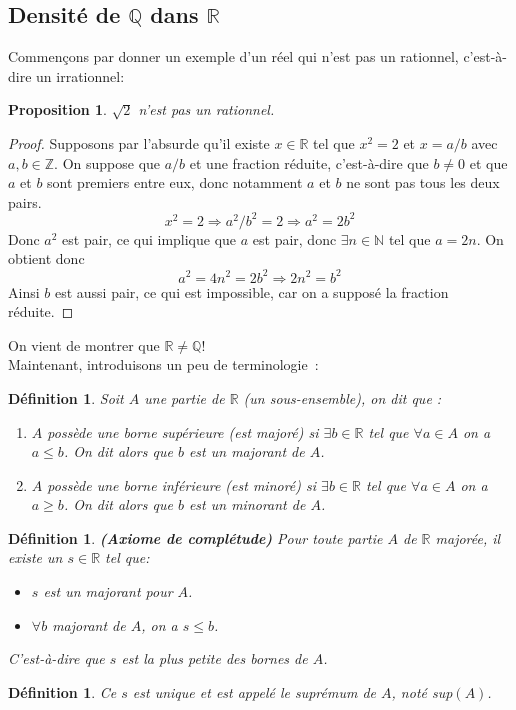 \documentclass[a4paper, 12pt, french, twoside]{article}
\newtheorem{proposition}[theorem]{Proposition}
\newtheorem{defi}[theorem]{Définition}
\newcommand{\Nn}{{\mathbb{N}}}
\newcommand{\Zz}{{\mathbb{Z}}}
\newcommand{\Rr}{{\mathbb{R}}}
\newcommand{\Qq}{{\mathbb{Q}}}
\begin{document}
\subsection{Densité de $\Qq$ dans $\Rr$}
Commençons par donner un exemple d'un réel qui n'est pas un rationnel, c'est-à-dire un irrationnel: 
\begin{proposition}
    $\sqrt{2}$ n'est pas un rationnel. 
\end{proposition}
\begin{proof}
   Supposons par l'absurde qu'il existe $x\in \Rr$ tel que $x^2=2$ et $x=a/b$ avec $a,b \in \Zz$. On suppose que $a/b$ et une fraction réduite, c'est-à-dire que $b\neq 0$ et que $a$ et $b$ sont premiers entre eux, donc notamment $a$ et $b$ ne sont pas tous les deux pairs. 
   $$x^2=2 \Rightarrow a^2/b^2=2 \Rightarrow a^2=2b^2$$
   Donc $a^2$ est pair, ce qui implique que $a$ est pair, donc $\exists n \in \Nn$ tel que $a=2n$. On obtient donc $$a^2=4n^2=2b^2 \Rightarrow 2n^2=b^2$$
   Ainsi $b$ est aussi pair, ce qui est impossible, car on a supposé la fraction réduite. 
\end{proof}
On vient de montrer que $\Rr \neq \Qq$!\\
Maintenant, introduisons un peu de terminologie : 
\begin{defi}
    Soit $A$ une partie de $\Rr$ (un sous-ensemble), on dit que : 
    \begin{enumerate}
        \item $A$ possède une borne supérieure (est majoré) si $\exists b \in \Rr $ tel que $\forall a \in A$ on a $a\leq b$. On dit alors que $b$ est un majorant de $A$. 
        \item $A$ possède une borne inférieure (est minoré) si $\exists b \in \Rr $ tel que $\forall a \in A$ on a $a\geq b$. On dit alors que $b$ est un minorant de $A$. 
    \end{enumerate}   
\end{defi}
\begin{defi}
    
\textbf{(Axiome de complétude)}  Pour toute partie $A$ de $\Rr$ majorée, il existe un $s\in \Rr$ tel que: 
\begin{itemize}
    \item $s$ est un majorant pour $A$.
    \item $\forall b$ majorant de $A$, on a $s\leq b$.
\end{itemize}
C'est-à-dire que $s$ est la plus petite des bornes de $A$.
\end{defi}
\begin{defi}
    Ce $s$ est unique et est appelé le suprémum de $A$, noté sup$(A)$.  
\end{defi}
\end{document}

